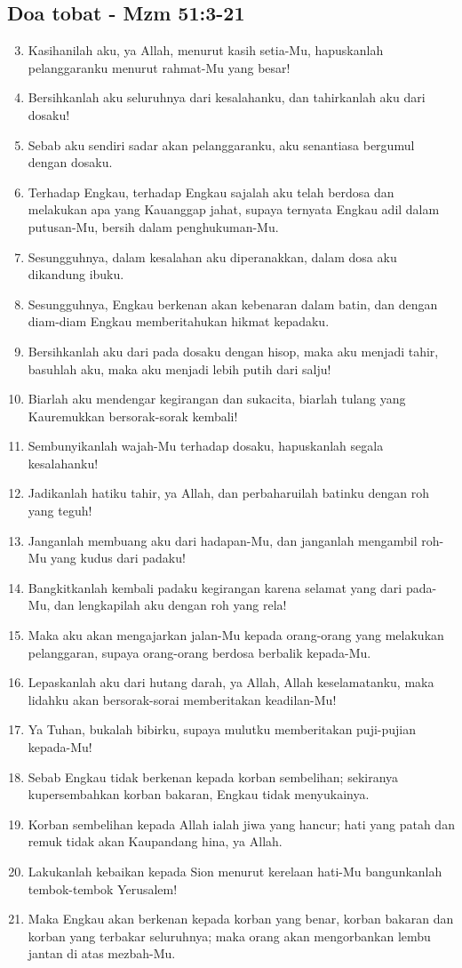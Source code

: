 \documentclass[a5paper,headsepline,titlepage,11pt,nnormalheadings,DIVcalc]{scrbook}
\begin{document}
\subsection*{Doa tobat - Mzm 51:3-21}
\begin{enumerate}
\setcounter{enumi}{2}
\item Kasihanilah aku, ya Allah, menurut kasih setia-Mu, hapuskanlah pelanggaranku menurut rahmat-Mu yang besar!
\item Bersihkanlah aku seluruhnya dari kesalahanku, dan tahirkanlah aku dari dosaku!
\item Sebab aku sendiri sadar akan pelanggaranku, aku senantiasa bergumul dengan dosaku.
\item Terhadap Engkau, terhadap Engkau sajalah aku telah berdosa dan melakukan apa yang Kauanggap jahat, supaya ternyata Engkau adil dalam putusan-Mu, bersih dalam penghukuman-Mu.
\item Sesungguhnya, dalam kesalahan aku diperanakkan, dalam dosa aku dikandung ibuku.
\item Sesungguhnya, Engkau berkenan akan kebenaran dalam batin, dan dengan diam-diam Engkau memberitahukan hikmat kepadaku.
\item Bersihkanlah aku dari pada dosaku dengan hisop, maka aku menjadi tahir, basuhlah aku, maka aku menjadi lebih putih dari salju!
\item Biarlah aku mendengar kegirangan dan sukacita, biarlah tulang yang Kauremukkan bersorak-sorak kembali!
\item Sembunyikanlah wajah-Mu terhadap dosaku, hapuskanlah segala kesalahanku!
\item Jadikanlah hatiku tahir, ya Allah, dan perbaharuilah batinku dengan roh yang teguh!
\item Janganlah membuang aku dari hadapan-Mu, dan janganlah mengambil roh-Mu yang kudus dari padaku!
\item Bangkitkanlah kembali padaku kegirangan karena selamat yang dari pada-Mu, dan lengkapilah aku dengan roh yang rela!
\item Maka aku akan mengajarkan jalan-Mu kepada orang-orang yang melakukan pelanggaran, supaya orang-orang berdosa berbalik kepada-Mu.
\item Lepaskanlah aku dari hutang darah, ya Allah, Allah keselamatanku, maka lidahku akan bersorak-sorai memberitakan keadilan-Mu!
\item Ya Tuhan, bukalah bibirku, supaya mulutku memberitakan puji-pujian kepada-Mu!
\item Sebab Engkau tidak berkenan kepada korban sembelihan; sekiranya kupersembahkan korban bakaran, Engkau tidak menyukainya.
\item Korban sembelihan kepada Allah ialah jiwa yang hancur; hati yang patah dan remuk tidak akan Kaupandang hina, ya Allah.
\item Lakukanlah kebaikan kepada Sion menurut kerelaan hati-Mu bangunkanlah tembok-tembok Yerusalem!
\item Maka Engkau akan berkenan kepada korban yang benar, korban bakaran dan korban yang terbakar seluruhnya; maka orang akan mengorbankan lembu jantan di atas mezbah-Mu.
\end{enumerate}
\end{document}
